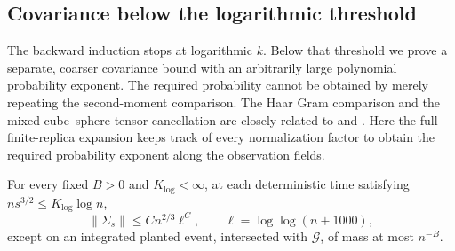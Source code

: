 \subsection{Covariance below the logarithmic threshold}
\label{prof:sec-bottom-scale}

The backward induction stops at logarithmic \(k\). Below that threshold
we prove a separate, coarser covariance bound with an arbitrarily large
polynomial probability exponent. The required probability cannot be
obtained by merely repeating the second-moment comparison.  The Haar Gram comparison and the mixed
cube--sphere tensor cancellation are closely related to
\citet[Section~3.3]{DuHuang2026CriticalFluctuations} and
\citet[Lemma~3.5]{DuHuang2026CriticalOverlap}.  Here the full
finite-replica expansion keeps track of every normalization factor to
obtain the required probability exponent along the observation fields.

\begin{proposition}
\label{prof:prop-bottom-covariance}
For every fixed \(B>0\) and \(K_{\log}<\infty\), at each deterministic
time satisfying \(ns^{3/2}\le K_{\log}\log n\),
\begin{equation}
 \|\Sigma_s\|\le Cn^{2/3}\ell^C,
 \qquad \ell=\log\log(n+1000),
 \label{prof:eq25}
\end{equation}
except on an integrated planted event, intersected with
\(\mathcal G\), of mass at most \(n^{-B}\).
\end{proposition}

